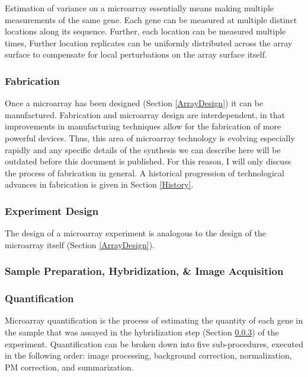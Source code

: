 Estimation of variance on a microarray essentially means making multiple
measurements of the same gene.  Each gene can be measured at multiple distinct
locations along its sequence.  Further, each location can be measured multiple
times, Further location replicates can be uniformly distributed across the
array surface to compensate for local perturbations on the array surface
itself.

\subsubsection{Fabrication}
\label{Fabrication}

Once a microarray has been designed (Section \ref{ArrayDesign}) it can be
manufactured.  Fabrication and microarray design are interdependent, in that
improvements in manufacturing techniques allow for the fabrication of more
powerful devices.  Thus, this area of microarray technology is evolving
especially rapidly and any specific details of the synthesis we can describe
here will be outdated before this document is published.  For this reason, I
will only discuss the process of fabrication in general.  A historical
progression of technological advances in fabrication is given in Section
\ref{History}.

\subsubsection{Experiment Design}
\label{ExperimentDesign}

The design of a microarray experiment is analogous to the design of the
microarray itself (Section \ref{ArrayDesign}).


\subsubsection{Sample Preparation, Hybridization, \& Image Acquisition}
\label{Hybridization}

\subsubsection{Quantification}
\label{Quantification}

Microarray quantification is the process of estimating the quantity of each
gene in the sample that was assayed in the hybridization step (Section
\ref{Hybridization}) of the experiment.  Quantification can be broken down into
five sub-procedures, executed in the following order: image processing,
background correction, normalization, PM correction, and summarization.


